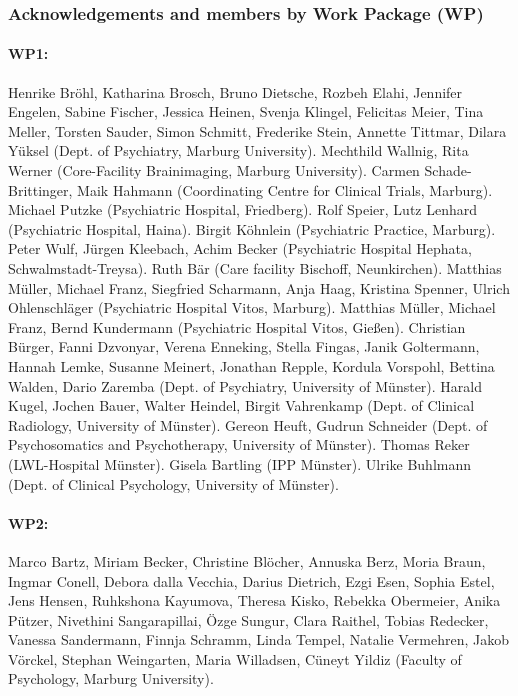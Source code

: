\documentclass{article}
\begin{document}
    \subsubsection*{Acknowledgements and members by Work Package (WP)}
    \paragraph{WP1:} Henrike Bröhl, Katharina Brosch, Bruno Dietsche, Rozbeh Elahi, Jennifer Engelen, Sabine Fischer, Jessica Heinen, Svenja Klingel, Felicitas Meier, Tina Meller, Torsten Sauder, Simon Schmitt, Frederike Stein, Annette Tittmar, Dilara Yüksel (Dept. of Psychiatry, Marburg University). Mechthild Wallnig, Rita Werner (Core-Facility Brainimaging, Marburg University). Carmen Schade-Brittinger, Maik Hahmann (Coordinating Centre for Clinical Trials, Marburg). Michael Putzke (Psychiatric Hospital, Friedberg). Rolf Speier, Lutz Lenhard (Psychiatric Hospital, Haina). Birgit Köhnlein (Psychiatric Practice, Marburg). Peter Wulf, Jürgen Kleebach, Achim Becker (Psychiatric Hospital Hephata, Schwalmstadt-Treysa). Ruth Bär (Care facility Bischoff, Neunkirchen). Matthias Müller, Michael Franz, Siegfried Scharmann, Anja Haag, Kristina Spenner, Ulrich Ohlenschläger (Psychiatric Hospital Vitos, Marburg). Matthias Müller, Michael Franz, Bernd Kundermann (Psychiatric Hospital Vitos, Gießen). Christian Bürger, Fanni Dzvonyar, Verena Enneking, Stella Fingas, Janik Goltermann, Hannah Lemke, Susanne Meinert, Jonathan Repple, Kordula Vorspohl, Bettina Walden, Dario Zaremba (Dept. of Psychiatry, University of Münster). Harald Kugel, Jochen Bauer, Walter Heindel, Birgit Vahrenkamp (Dept. of Clinical Radiology, University of Münster). Gereon Heuft, Gudrun Schneider (Dept. of Psychosomatics and Psychotherapy, University of Münster). Thomas Reker (LWL-Hospital Münster). Gisela Bartling (IPP Münster). Ulrike Buhlmann (Dept. of Clinical Psychology, University of Münster).
    \paragraph{WP2:} Marco Bartz, Miriam Becker, Christine Blöcher, Annuska Berz, Moria Braun, Ingmar Conell, Debora dalla Vecchia, Darius Dietrich, Ezgi Esen, Sophia Estel, Jens Hensen, Ruhkshona Kayumova, Theresa Kisko, Rebekka Obermeier, Anika Pützer, Nivethini Sangarapillai, Özge Sungur, Clara Raithel, Tobias Redecker, Vanessa Sandermann, Finnja Schramm, Linda Tempel, Natalie Vermehren, Jakob Vörckel, Stephan Weingarten, Maria Willadsen, Cüneyt Yildiz (Faculty of Psychology, Marburg University).
\end{document}
